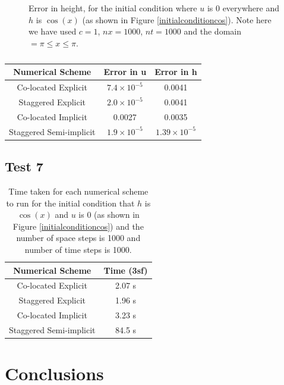 \documentclass[a4paper,12pt, notitlepage]{article}
\begin{document}
{\begin{figure} [H]
\begin{minipage}{.5\textwidth}
		\caption{\label{error_height} Error in height, for the initial condition where $u$ is 0 everywhere and $h$ is $\cos(x)$ (as shown in Figure \ref{initialconditioncos}). Note here we have used $c = 1$, $nx = 1000$, $nt = 1000$ and the domain $=\pi\leq x \leq \pi$.} 
	\end{minipage}
\end{figure}

\begin{table}[H]
	\centering
	\begin{tabular}{|c | c| c|} 
		\hline
		\textbf{Numerical Scheme} & \textbf{Error in u} & \textbf{Error in h}  \\
		\hline
		Co-located Explicit & $7.4 \times 10^{-5}$ & 0.0041\\ 
		\hline
		Staggered Explicit &  $2.0 \times 10^{-5}$ & 0.0041\\
		\hline
		Co-located  Implicit & 0.0027 & 0.0035 \\
		\hline
		Staggered Semi-implicit & $1.9 \times 10^{-5}$ & $1.39\times 10 ^{-5}$ \\
		\hline
	\end{tabular}
	\caption{}
	\label{errortable}
\end{table}

\subsection{Test 7}

\begin{table}[H]
	\centering
	\begin{tabular}{|c | c|} 
		\hline
		\textbf{Numerical Scheme} & \textbf{Time (3sf)}  \\
		\hline
		Co-located Explicit & 2.07 s \\ 
		\hline
	    Staggered Explicit & 1.96 s \\
		\hline
		Co-located  Implicit & 3.23 s \\
		\hline
		Staggered Semi-implicit & 84.5 s \\
		\hline
	\end{tabular}
\caption{Time taken for each numerical scheme to run for the initial condition that $h$ is $\cos(x)$ and $u$ is $0$ (as shown in Figure \ref{initialconditioncos}) and the number of space steps is 1000 and number of time steps is 1000.}
\label{timingtable}
\end{table}

\section{Conclusions}

}
\end{document}
